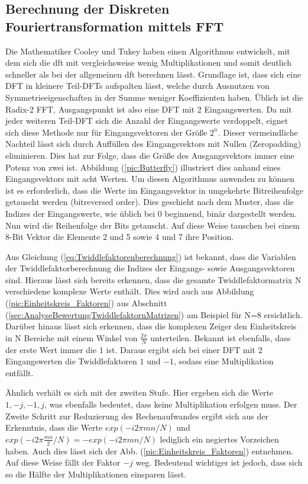 \subsection{Berechnung der Diskreten Fouriertransformation mittels FFT}\label{sec:BerechnungFFT}
Die Mathematiker Cooley und Tukey haben einen Algorithmus entwickelt, mit dem sich die \gls{dft} mit vergleichsweise wenig Multiplikationen
und somit deutlich schneller als bei der allgemeinen \gls{dft} berechnen lässt. Grundlage ist, dass sich eine DFT
in kleinere Teil-DFTs aufspalten lässt, welche durch Ausnutzen von Symmetrieeigenschaften in der Summe weniger Koeffizienten haben. 
Üblich ist die Radix-2 FFT, Ausgangspunkt ist also eine DFT mit 2 Eingangswerten.
Da mit jeder weiteren Teil-DFT sich die Anzahl der Eingangswerte verdoppelt, eignet sich diese Methode nur für Eingangsvektoren der Größe $2^n$. Dieser
vermeindliche Nachteil lässt sich durch Auffüllen des Eingangsvektors mit Nullen (Zeropadding) eliminieren. Dies hat zur Folge, dass die Größe des Ausgangsvektors
immer eine Potenz von zwei ist. Abbildung (\ref{pic:Butterfly}) illustriert dies anhand eines Eingangsvektors mit acht Werten. 
Um diesen Algorithmus anwenden zu können ist es erforderlich, dass die Werte im Eingangsvektor in umgekehrte Bitreihenfolge getauscht werden (bitreversed order).
Dies geschieht nach dem Muster, dass die Indizes der Eingangswerte, wie
üblich bei 0 beginnend, binär dargestellt werden. Nun wird die Reihenfolge der Bits getauscht. Auf diese Weise tauschen bei einem 8-Bit Vektor die
Elemente 2 und 5 sowie 4 und 7 ihre Position.

Aus Gleichung (\ref{eq:Twiddlefaktorenberechnung}) ist 
bekannt, dass die Variablen der Twiddlefaktorberechnung die Indizes der Eingangs- sowie Ausgangsvektoren sind. Hieraus lässt sich bereits erkennen, dass
die gesamte Twiddlefaktormatrix N verschiedene komplexe Werte enthält. Dies wird auch aus Abbildung (\ref{pic:Einheitskreis_Faktoren}) aus Abschnitt 
(\ref{sec:AnalyseBewertungTwiddlefaktornMatrizen}) am Beispiel für N=8 ersichtlich. Darüber hinaus lässt sich erkennen, dass die komplexen Zeiger den Einheitskreis 
in N Bereiche mit einem Winkel von $\frac{2 \pi}{N}$ unterteilen. Bekannt ist ebenfalls, dass der erste Wert immer die $1$ ist.
Daraus ergibt sich bei einer DFT mit 2 Eingangswerten die Twiddlefaktoren $1$ und $-1$, sodass eine Multiplikation entfällt. 

Ähnlich verhält es sich mit der zweiten Stufe.
Hier ergeben sich die Werte $1, -j, -1, j$, was ebenfalls bedeutet, dass keine Multiplikation erfolgen muss. Der Zweite Schritt zur Reduzierung des Rechenaufwandes ergibt sich
aus der Erkenntnis, dass die Werte $exp(-i 2 \pi m n/N)$ und $exp(-i 2 \pi \frac{m n}{2}/N) = -exp(-i 2 \pi m n/N)$ lediglich ein negiertes Vorzeichen haben. Auch dies lässt sich der Abb. 
(\ref{pic:Einheitskreis_Faktoren}) entnehmen. Auf diese Weise fällt der Faktor $-j$ weg. Bedeutend wichtiger ist jedoch, dass sich so die Hälfte der Multiplikationen einsparen lässt.

